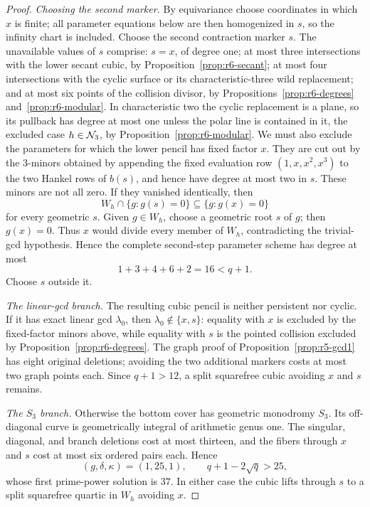 \begin{proof}
\emph{Choosing the second marker.}
By equivariance choose coordinates in which \(x\) is finite; all
parameter equations below are then homogenized in \(s\), so the
infinity chart is included.
Choose the second contraction marker \(s\).  The unavailable values of
\(s\) comprise: \(s=x\), of degree one; at most three intersections
with the lower secant cubic, by
Proposition~\ref{prop:r6-secant}; at most four intersections with the
cyclic surface or its characteristic-three wild replacement; and at
most six points of the collision divisor, by
Propositions~\ref{prop:r6-degrees} and~\ref{prop:r6-modular}.  In
characteristic two the cyclic
replacement is a plane, so its pullback has degree at most one unless
the polar line is contained in it, the excluded case
\(h\in\mathcal N_3\), by Proposition~\ref{prop:r6-modular}.  We must also
exclude the parameters for which the
lower pencil has fixed factor \(x\).  They are cut out by the
\(3\)-minors obtained by appending the fixed evaluation row
\((1,x,x^2,x^3)\) to the two Hankel rows of \(b(s)\), and hence have
degree at most two in \(s\).  These minors are not all zero.  If they
vanished identically, then
\[
  W_h\cap\{g:g(s)=0\}\subseteq\{g:g(x)=0\}
\]
for every geometric \(s\).  Given \(g\in W_h\), choose a geometric
root \(s\) of \(g\); then \(g(x)=0\).  Thus \(x\) would divide every
member of \(W_h\), contradicting the trivial-gcd hypothesis.  Hence
the complete second-step parameter
scheme has degree at most
\[
                         1+3+4+6+2=16<q+1.
\]
Choose \(s\) outside it.

\emph{The linear-gcd branch.}
The resulting cubic pencil is neither persistent nor cyclic.  If it
has exact linear gcd \(\lambda_0\), then
\(\lambda_0\notin\{x,s\}\): equality with \(x\) is excluded by the
fixed-factor minors above, while equality with \(s\) is the pointed
collision excluded by Proposition~\ref{prop:r6-degrees}.  The
graph proof of Proposition~\ref{prop:r5-gcd1} has eight original deletions; avoiding
the two additional markers costs at most two graph points each.
Since \(q+1>12\), a split squarefree cubic avoiding \(x\) and \(s\)
remains.

\emph{The \(S_3\) branch.}
Otherwise the bottom cover has geometric monodromy \(S_3\).  Its
off-diagonal curve is geometrically integral of arithmetic genus one.
The singular, diagonal, and branch deletions cost at most thirteen,
and the fibers through \(x\) and \(s\) cost at most six ordered pairs
each.  Hence
\[
 (g,\delta,\kappa)=(1,25,1),\qquad
 q+1-2\sqrt q>25,
\]
whose first prime-power solution is \(37\).  In either case the cubic
lifts through \(s\) to a split squarefree quartic in \(W_h\) avoiding
\(x\).
\end{proof}

